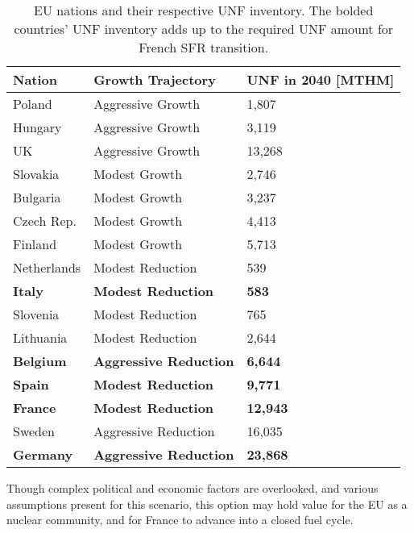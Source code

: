 \begin{table}[h]
    \centering
                \begin{tabularx}{\textwidth}{lbb}
                    \hline 
                    \textbf{Nation} & \textbf{Growth Trajectory} & \small{\textbf{UNF in 2040 [MTHM] }}\\
                    \hline
                    Poland & Aggressive Growth & 1,807\\
                    \hline
                    Hungary & Aggressive Growth & 3,119 \\ 
                    \hline
                    UK & Aggressive Growth & 13,268\\
                    \hline
                    Slovakia & Modest Growth & 2,746\\
                    \hline
                    Bulgaria & Modest Growth & 3,237 \\
                    \hline
                    Czech Rep. & Modest Growth & 4,413\\
                    \hline
                    Finland & Modest Growth &  5,713\\
                    \hline
                    Netherlands & Modest Reduction & 539\\
                    \hline
                    \textbf{Italy} & \textbf{Modest Reduction} & \textbf{583}\\
                    \hline
                    Slovenia & Modest Reduction & 765\\
                    \hline
                    Lithuania & Modest Reduction & 2,644 \\
                    \hline
                    \textbf{Belgium} & \textbf{Aggressive Reduction} & \textbf{6,644}\\
                    \hline 
                    \textbf{Spain} & \textbf{Modest Reduction} &  \textbf{9,771} \\
                    \hline
                    \textbf{France} & \textbf{Modest Reduction} & \textbf{12,943} \\
                    \hline
                    Sweden & Aggressive Reduction & 16,035\\
                    \hline
                    \textbf{Germany} & \textbf{Aggressive Reduction} & \textbf{23,868}\\
                    \hline
                \end{tabularx}
    \caption {\gls{EU} nations and their respective \gls{UNF} inventory. The bolded countries'
              \gls{UNF} inventory adds up to the required \gls{UNF} amount for French \gls{SFR} transition. }
    \label{tab:which_send}

\end{table}

Though complex political and economic factors are overlooked,
 and various assumptions present for this scenario,
this option may hold value for the \gls{EU} as a nuclear community,
and for France to advance into a closed fuel cycle.
